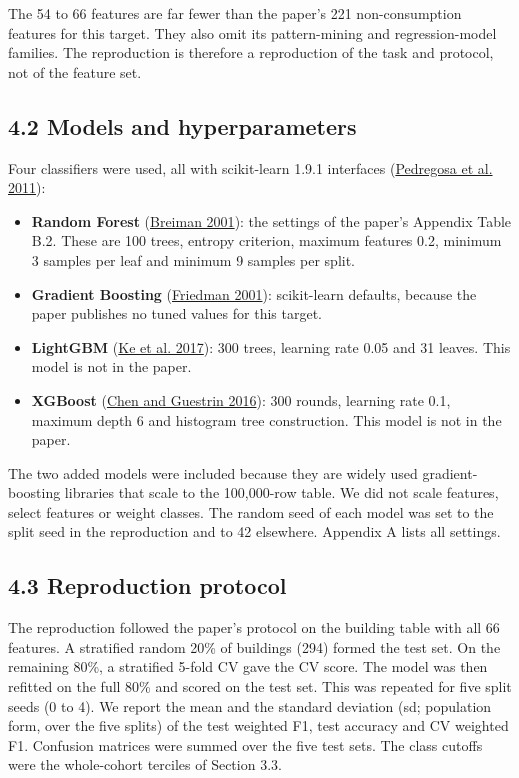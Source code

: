 \documentclass[
  10pt,
]{article}
\providecommand{\tightlist}{%
  \setlength{\itemsep}{0pt}\setlength{\parskip}{0pt}}
\begin{document}
The 54 to 66 features are far fewer than the paper's 221 non-consumption
features for this target. They also omit its pattern-mining and
regression-model families. The reproduction is therefore a reproduction
of the task and protocol, not of the feature set.

\hypertarget{models-and-hyperparameters}{%
\subsection{4.2 Models and
hyperparameters}\label{models-and-hyperparameters}}

Four classifiers were used, all with scikit-learn 1.9.1 interfaces
(\protect\hyperlink{ref-pedregosa2011}{Pedregosa et al. 2011}):

\begin{itemize}
\tightlist
\item
  \textbf{Random Forest} (\protect\hyperlink{ref-breiman2001}{Breiman
  2001}): the settings of the paper's Appendix Table B.2. These are 100
  trees, entropy criterion, maximum features 0.2, minimum 3 samples per
  leaf and minimum 9 samples per split.
\item
  \textbf{Gradient Boosting}
  (\protect\hyperlink{ref-friedman2001}{Friedman 2001}): scikit-learn
  defaults, because the paper publishes no tuned values for this target.
\item
  \textbf{LightGBM} (\protect\hyperlink{ref-ke2017}{Ke et al. 2017}):
  300 trees, learning rate 0.05 and 31 leaves. This model is not in the
  paper.
\item
  \textbf{XGBoost} (\protect\hyperlink{ref-chen2016}{Chen and Guestrin
  2016}): 300 rounds, learning rate 0.1, maximum depth 6 and histogram
  tree construction. This model is not in the paper.
\end{itemize}

The two added models were included because they are widely used
gradient-boosting libraries that scale to the 100,000-row table. We did
not scale features, select features or weight classes. The random seed
of each model was set to the split seed in the reproduction and to 42
elsewhere. Appendix A lists all settings.

\hypertarget{reproduction-protocol}{%
\subsection{4.3 Reproduction protocol}\label{reproduction-protocol}}

The reproduction followed the paper's protocol on the building table
with all 66 features. A stratified random 20\% of buildings (294) formed
the test set. On the remaining 80\%, a stratified 5-fold CV gave the CV
score. The model was then refitted on the full 80\% and scored on the
test set. This was repeated for five split seeds (0 to 4). We report the
mean and the standard deviation (sd; population form, over the five
splits) of the test weighted F1, test accuracy and CV weighted F1.
Confusion matrices were summed over the five test sets. The class
cutoffs were the whole-cohort terciles of Section 3.3.
\end{document}
